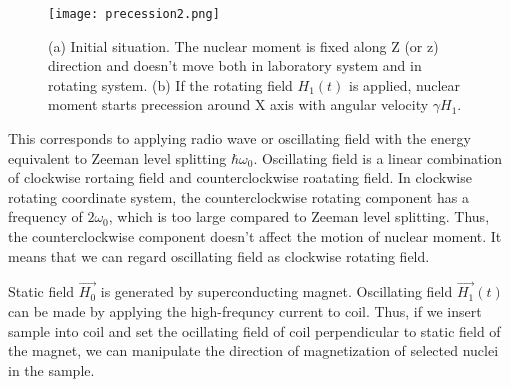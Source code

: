 \documentclass[a4,10.5pt]{report}
\begin{document}
\begin{figure}
  \centering
  \texttt{[image: precession2.png]}
  \caption{(a) Initial situation.
  The nuclear moment is fixed along Z (or z) direction and doesn't move both in laboratory system and in rotating system.
  (b) If the rotating field $H_1 (t)$ is applied, nuclear moment starts precession around X axis with angular velocity $\gamma H_1$.}
  \label{precession2}
\end{figure}

This corresponds to applying radio wave or oscillating field with the energy equivalent to Zeeman level splitting $\hbar\omega_0$.
Oscillating field is a linear combination of clockwise rortaing field and counterclockwise roatating field.
In clockwise rotating coordinate system, the counterclockwise rotating component has a frequency of $2\omega_0$, which is too large compared to Zeeman level splitting.
Thus, the counterclockwise component doesn't affect the motion of nuclear moment.
It means that we can regard oscillating field as clockwise rotating field.

Static field $\overrightarrow{H_0}$ is generated by superconducting magnet.
Oscillating field $\overrightarrow{H_1}(t)$ can be made by applying the high-frequncy current to coil.
Thus, if we insert sample into coil and set the ocillating field of coil perpendicular to static field of the magnet,
we can manipulate the direction of magnetization of selected nuclei in the sample.
\end{document}
